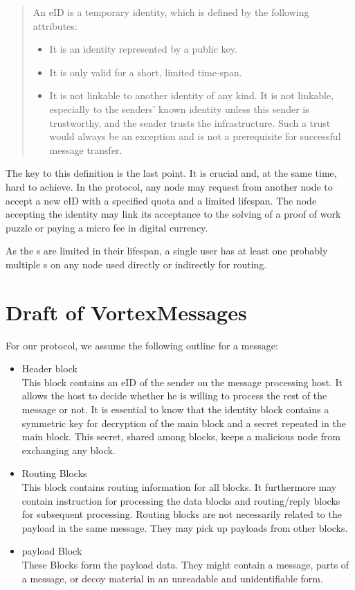 \begin{quote}
	An eID is a temporary identity, which is defined by the following attributes:
	\begin{itemize}
		\item It is an identity represented by a public key.
		\item It is only valid for a short, limited time-span.
		\item It is not linkable to another identity of any kind. It is not linkable, especially to the senders' known identity unless this sender is trustworthy, and the sender trusts the infrastructure. Such a trust would always be an exception and is not a prerequisite for successful message transfer.
	\end{itemize}
\end{quote}
The key to this definition is the last point. It is crucial and, at the same time, hard to achieve. In the protocol, any node may request from another node to accept a new eID with a specified quota and a limited lifespan. The node accepting the identity may link its acceptance to the solving of a proof of work puzzle or paying a micro fee in digital currency.

As the s are limited in their lifespan, a single user has at least one probably multiple s on any node used directly or indirectly for routing.

\section{Draft of VortexMessages}
For our protocol, we assume the following outline for a message:
\begin{itemize}
	\item Header block\\ 
	This block contains an eID of the sender on the message processing host. It allows the host to decide whether he is willing to process the rest of the message or not. It is essential to know that the identity block contains a symmetric key for decryption of the main block and a secret repeated in the main block. This secret, shared among blocks, keeps a malicious node from exchanging any block.
	\item Routing Blocks\\
	This block contains routing information for all blocks. It furthermore may contain instruction for processing the data blocks and routing/reply blocks for subsequent processing. Routing blocks are not necessarily related to the payload in the same message. They may pick up payloads from other blocks.
	\item payload Block\\
	These Blocks form the payload data. They might contain a message, parts of a message, or decoy material in an unreadable and unidentifiable form.
\end{itemize}

